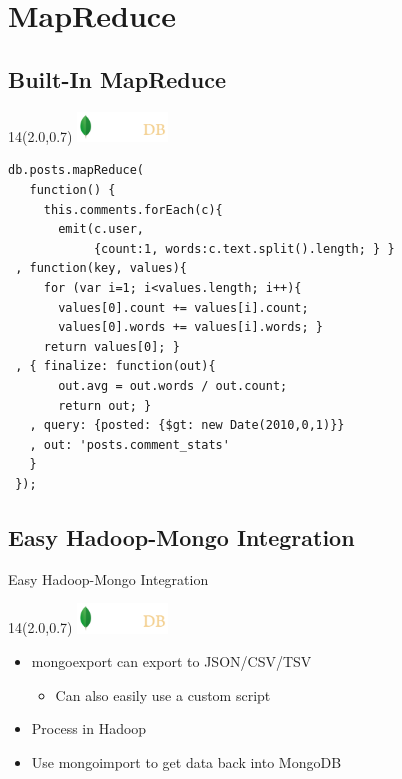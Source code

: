 \documentclass{beamer}
\newcommand{\MongoLogo}{
\begin{textblock}{14}(2.0,0.7)
  \includegraphics[height=0.8cm]{logo-mongodb-ondark.png}
\end{textblock}
}
\begin{document}
\section{MapReduce}

\subsection{Built-In MapReduce}
\begin{frame} [fragile]
  \MongoLogo

  \begin{small}
  \begin{verbatim}
db.posts.mapReduce(
   function() {
     this.comments.forEach(c){
       emit(c.user, 
            {count:1, words:c.text.split().length; } }
 , function(key, values){
     for (var i=1; i<values.length; i++){
       values[0].count += values[i].count;
       values[0].words += values[i].words; }
     return values[0]; }
 , { finalize: function(out){
       out.avg = out.words / out.count;
       return out; }
   , query: {posted: {$gt: new Date(2010,0,1)}}
   , out: 'posts.comment_stats'
   }
 });
  \end{verbatim}
  \end{small}
\end{frame}


\subsection{Easy Hadoop-Mongo Integration}
\begin{frame}{Easy Hadoop-Mongo Integration}
  \MongoLogo

  \begin{itemize}
    \item mongoexport can export to JSON/CSV/TSV
      \begin{itemize}
        \item Can also easily use a custom script
      \end{itemize}
    \item Process in Hadoop
    \item Use mongoimport to get data back into MongoDB
  \end{itemize}

\end{frame}
\end{document}
